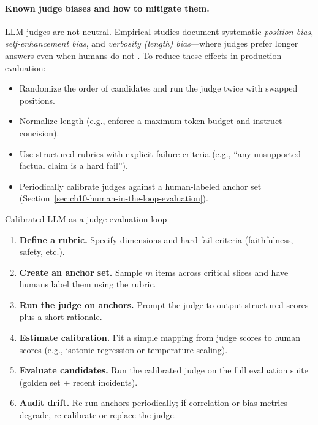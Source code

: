 \paragraph{Known judge biases and how to mitigate them.}
LLM judges are not neutral. Empirical studies document systematic \emph{position bias}, \emph{self-enhancement bias}, and \emph{verbosity (length) bias}—where judges prefer longer answers even when humans do not \cite{zheng2023judge,saito2023verbositybias}.
To reduce these effects in production evaluation:
\begin{itemize}
    \item Randomize the order of candidates and run the judge twice with swapped positions.
    \item Normalize length (e.g., enforce a maximum token budget and instruct concision).
    \item Use structured rubrics with explicit failure criteria (e.g., ``any unsupported factual claim is a hard fail'').
    \item Periodically calibrate judges against a human-labeled anchor set (Section~\ref{sec:ch10-human-in-the-loop-evaluation}).
\end{itemize}

\begin{llmalgobox}{Calibrated LLM-as-a-judge evaluation loop}
\label{alg:ch10_llm_judge_calibration}
\begin{enumerate}[leftmargin=1.6em, itemsep=3pt]
    \item \textbf{Define a rubric.} Specify dimensions and hard-fail criteria (faithfulness, safety, etc.).
    \item \textbf{Create an anchor set.} Sample $m$ items across critical slices and have humans label them using the rubric.
    \item \textbf{Run the judge on anchors.} Prompt the judge to output structured scores plus a short rationale.
    \item \textbf{Estimate calibration.} Fit a simple mapping from judge scores to human scores (e.g., isotonic regression or temperature scaling).
    \item \textbf{Evaluate candidates.} Run the calibrated judge on the full evaluation suite (golden set + recent incidents).
    \item \textbf{Audit drift.} Re-run anchors periodically; if correlation or bias metrics degrade, re-calibrate or replace the judge.
\end{enumerate}
\end{llmalgobox}

